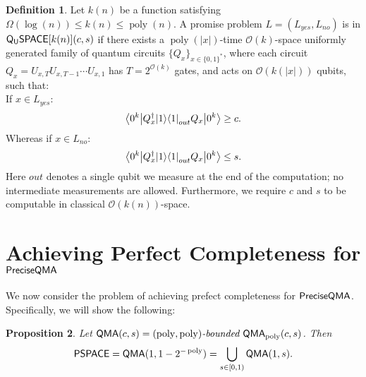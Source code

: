 \documentclass[11pt]{article}
\newtheorem{theorem}{Theorem}
\newtheorem{proposition}[theorem]{Proposition}
\theoremstyle{definition}
\newtheorem{definition}[theorem]{Definition}
\theoremstyle{remark}
\newcommand\QMA{{\sf{QMA}}}
\newcommand\QSPACE{{\sf{Q_{U}SPACE}}}
\newcommand\PSPACE{{\sf{PSPACE}}}
\newcommand\QMAexp{{\sf{PreciseQMA}}}
\newcommand\bddQMA[5]{{\left(#1,#2\right)}\textit{-bounded }\QMA_{#3}(#4,#5)}
\newcommand\revPSPACE{{\sf{revPSPACE}}}
\newcommand\bigoh{\mathcal{O}}
\DeclareMathOperator{\poly}{poly}
\begin{document}
\begingroup
\def\thedefinition{\ref{def: qspace}}
\begin{definition}
Let $k(n)$ be a function satisfying $\Omega(\log(n)) \le k(n) \le \poly(n)$. A promise problem $L=(L_{yes},L_{no})$ is in $\QSPACE[k(n)](c,s)$ if there exists a $\poly(|x|)$-time $\mathcal{O}(k)$-space uniformly generated family of quantum circuits $\{Q_x\}_{x\in\{0,1\}^*}$, where each circuit $Q_x=U_{x,T}U_{x,T-1}\cdots U_{x,1}$ has $T=2^{\mathcal{O}(k)}$ gates, and acts on $\mathcal{O}(k(|x|))$ qubits, such that:\\
 If $x \in L_{yes}$:
\begin{equation}
{\left\langle{0^k}\right\vert} Q^\dagger_x {\left\vert{1}\right\rangle}{\left\langle{1}\right\vert}_{out} Q_x {\left\vert{0^k}\right\rangle} \ge c.
\end{equation}
Whereas if $x \in L_{no}$:
\begin{equation}
{\left\langle{0^k}\right\vert} Q^\dagger_x {\left\vert{1}\right\rangle}{\left\langle{1}\right\vert}_{out} Q_x {\left\vert{0^k}\right\rangle} \le s.
\end{equation}
Here $out$ denotes a single qubit we measure at the end of the computation; no intermediate measurements are allowed.  
Furthermore, we require $c$ and $s$ to be computable in classical $\bigoh(k(n))$-space.
\end{definition}
\addtocounter{theorem}{-1}
\endgroup

\section{Achieving Perfect Completeness for $\QMAexp$}\label{app:perfectcompleteness}
%
We now consider the problem of achieving prefect completeness for $\QMAexp$. Specifically, we will show the following:
\begingroup
\def\theproposition{\ref{prop: perfect completeness}}
\begin{proposition} Let $\QMA(c,s) = \bddQMA{\poly}{\poly}{\poly}{c}{s}$. Then
\[
\PSPACE = \QMA(1,1-2^{-\poly}) = \bigcup_{s \in [0,1)}\QMA(1,s).
\]
\end{proposition}
\addtocounter{theorem}{-1}
\endgroup
\end{document}
